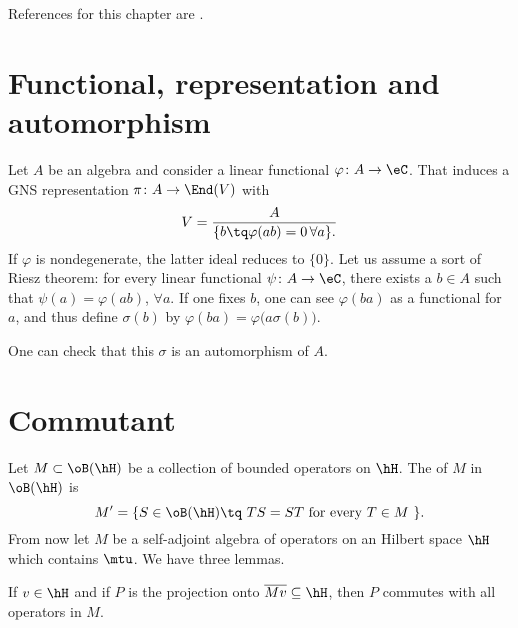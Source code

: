 References for this chapter are \cite{Wassermann}.

					\section{Functional, representation and automorphism}

Let $A$ be an algebra and consider a linear functional $\varphi\colon A\to \eC$. That induces a GNS representation $\pi\colon A\to \End(V)$ with
\begin{equation}
  V=\frac{ A }{ \{ b\tq\varphi(ab)=0\,\forall a \}. }
\end{equation}
If $\varphi$ is nondegenerate, the latter ideal reduces to $\{ 0 \}$. Let us assume a sort of Riesz theorem: for every linear functional $\psi\colon A\to \eC$, there exists a $b\in A$ such that $\psi(a)=\varphi(ab)$, $\forall a$. If one fixes $b$, one can see $\varphi(ba)$ as a functional for $a$, and thus define $\sigma(b)$ by
$\varphi(ba)=\varphi\big(a\sigma(b)\big)$.

One can check that this $\sigma$ is an automorphism of $A$.

\section{Commutant}

Let $M\subset\oB(\hH)$ be a collection of bounded operators on $\hH$. The  of $M$ in $\oB(\hH)$ is
\begin{equation}
M'=\{ S\in\oB(\hH)\tq \text{ $TS=ST$ for every $T\in M$ } \}.
\end{equation}
From now let $M$ be a self-adjoint algebra of operators on an Hilbert space $\hH$ which contains $\mtu$. We have three lemmas.

\begin{lemma}		\label{LemUnVN}
If $v\in\hH$ and if $P$ is the projection onto $\overline{ Mv }\subseteq \hH$, then $P$ commutes with all operators in $M$. 
\end{lemma}


